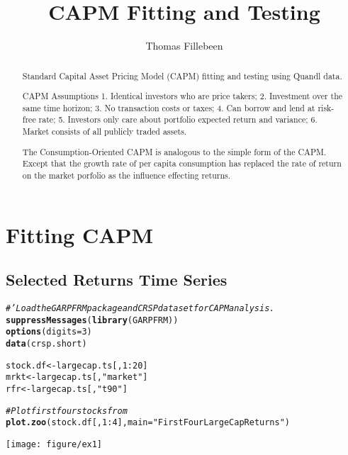 \documentclass[a4paper]{article}\usepackage[]{graphicx}\usepackage[]{color}
\makeatletter
\def\maxwidth{ %
  \ifdim\Gin@nat@width>\linewidth
    \linewidth
  \else
    \Gin@nat@width
  \fi
}
\newcommand{\hlnum}[1]{\textcolor[rgb]{0.686,0.059,0.569}{#1}}%
\newcommand{\hlstr}[1]{\textcolor[rgb]{0.192,0.494,0.8}{#1}}%
\newcommand{\hlcom}[1]{\textcolor[rgb]{0.678,0.584,0.686}{\textit{#1}}}%
\newcommand{\hlopt}[1]{\textcolor[rgb]{0,0,0}{#1}}%
\newcommand{\hlstd}[1]{\textcolor[rgb]{0.345,0.345,0.345}{#1}}%
\newcommand{\hlkwb}[1]{\textcolor[rgb]{0.69,0.353,0.396}{#1}}%
\newcommand{\hlkwc}[1]{\textcolor[rgb]{0.333,0.667,0.333}{#1}}%
\newcommand{\hlkwd}[1]{\textcolor[rgb]{0.737,0.353,0.396}{\textbf{#1}}}%
\newenvironment{kframe}{%
 \def\at@end@of@kframe{}%
 \ifinner\ifhmode%
  \def\at@end@of@kframe{\end{minipage}}%
  \begin{minipage}{\columnwidth}%
 \fi\fi%
 \def\FrameCommand##1{\hskip\@totalleftmargin \hskip-\fboxsep
 \colorbox{shadecolor}{##1}\hskip-\fboxsep
     \hskip-\linewidth \hskip-\@totalleftmargin \hskip\columnwidth}%
 \MakeFramed {\advance\hsize-\width
   \@totalleftmargin\z@ \linewidth\hsize
   \@setminipage}}%
 {\par\unskip\endMakeFramed%
 \at@end@of@kframe}
\newenvironment{knitrout}{}{} %
\makeatother
\begin{document}
\title{CAPM Fitting and Testing}
\author{Thomas Fillebeen}

\maketitle

\begin{abstract}
Standard Capital Asset Pricing Model (CAPM) fitting and testing using Quandl data.

CAPM Assumptions
1. Identical investors who are price takers;
2. Investment over the same time horizon; 
3. No transaction costs or taxes;
4. Can borrow and lend at risk-free rate;
5. Investors only care about portfolio expected return and variance;
6. Market consists of all publicly traded assets.

The Consumption-Oriented CAPM is analogous to the simple form of the CAPM. Except that the growth rate of per capita consumption has replaced the rate of return on the market porfolio as the influence effecting returns.
\end{abstract}

\tableofcontents

\section{Fitting CAPM}
\subsection{Selected Returns Time Series}
\begin{knitrout}
\color{fgcolor}\begin{kframe}
\begin{alltt}
\hlcom{# 'Load the GARPFRM package and CRSP dataset for CAPM analysis.}
\hlkwd{suppressMessages}\hlstd{(}\hlkwd{library}\hlstd{(GARPFRM))}
\hlkwd{options}\hlstd{(}\hlkwc{digits} \hlstd{=} \hlnum{3}\hlstd{)}
\hlkwd{data}\hlstd{(crsp.short)}

\hlstd{stock.df} \hlkwb{<-} \hlstd{largecap.ts[,} \hlnum{1}\hlopt{:}\hlnum{20}\hlstd{]}
\hlstd{mrkt} \hlkwb{<-} \hlstd{largecap.ts[,} \hlstr{"market"}\hlstd{]}
\hlstd{rfr} \hlkwb{<-} \hlstd{largecap.ts[,} \hlstr{"t90"}\hlstd{]}

\hlcom{# Plot first four stocks from}
\hlkwd{plot.zoo}\hlstd{(stock.df[,} \hlnum{1}\hlopt{:}\hlnum{4}\hlstd{],} \hlkwc{main} \hlstd{=} \hlstr{"First Four Large Cap Returns"}\hlstd{)}
\end{alltt}
\end{kframe}
\texttt{[image: figure/ex1]} 

\end{knitrout}
\end{document}
